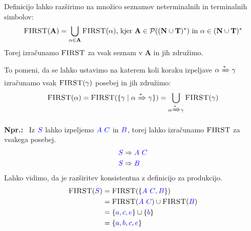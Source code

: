 \documentclass{article}
\newcommand{\Ex}{\textbf{Npr.:}\ }
\newcommand{\FIRST}{\textsc{FIRST}}
\newcommand{\Set}[1]{\mathbf{#1}}
\newcommand{\Symbol}[1]{\textcolor{blue}{#1}}
\newcommand{\Terminals}{\Set{T}}
\newcommand{\NonTerminals}{\Set{N}}
\newcommand{\Powerset}[1]{\mathcal{P}(#1)}
\newcommand{\Derive}{\Rightarrow}
\newcommand{\DeriveStar}{\xRightarrow{\ast}}
\newcommand{\Seq}{\ }
\newcommand{\Kleene}[1]{#1^\ast}
\begin{document}
Definicijo lahko razširimo na množico seznamov neterminalnih in terminalnih simbolov:
\begin{equation*}
  \FIRST(\Set{A}) = \bigcup_{\alpha \in \Set{A}} \FIRST(\alpha) \text{, kjer } \Set{A} \in \Powerset{\Kleene{(\NonTerminals \cup \Terminals)}} \text{ in } \alpha \in \Kleene{(\NonTerminals \cup \Terminals)}
\end{equation*}
Torej izračunamo $\FIRST$ za vsak seznam v $\Set{A}$ in jih združimo.

To pomeni, da se lahko ustavimo na katerem koli koraku izpeljave $\alpha \DeriveStar \gamma$ izračunamo vsak $\FIRST(\gamma)$ posebej in jih združimo:
\begin{equation*}
  \FIRST(\alpha) = \FIRST(\{\gamma \mid \alpha \DeriveStar \gamma\}) = \bigcup_{\alpha \DeriveStar \gamma} \FIRST(\gamma)
\end{equation*}

\Ex
  Iz $\Symbol{S}$ lahko izpeljemo $\Symbol{A} \Seq \Symbol{C}$ in $\Symbol{B}$, torej lahko izračunamo $\FIRST$ za vsakega posebej.
  \begin{align*}
    \Symbol{S} &\Derive \Symbol{A} \Seq \Symbol{C}\\
    \Symbol{S} &\Derive \Symbol{B}
  \end{align*}
  Lahko vidimo, da je razširitev konsistentna z definicijo za produkcijo.
  \begin{align*}
    \FIRST(\Symbol{S}) &= \FIRST(\{\Symbol{A} \Seq \Symbol{C}, \Symbol{B}\}) \\
              &= \FIRST(\Symbol{A} \Seq \Symbol{C}) \cup \FIRST(\Symbol{B})\\
              &= \{\Symbol{a}, \Symbol{c}, \Symbol{e}\} \cup \{\Symbol{b}\} \\
              &= \{\Symbol{a}, \Symbol{b}, \Symbol{c}, \Symbol{e}\}
  \end{align*}
\end{document}
